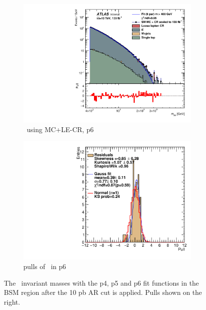 \begin{figure}[H]
\begin{subfigure}[h]{0.38\linewidth}
    \includegraphics[scale=0.3]{figs/ch6/fit/variable_nosmooth/p6/10PB/output_SMMCplusCR_Mbb_p6.pdf}%
    \caption{\mbb \ using MC+LE-CR, p6}
    \end{subfigure}
    \hfill
    \begin{subfigure}[h]{0.4\linewidth}
    \includegraphics[scale=0.32]{figs/ch6/fit/variable_nosmooth/p6/10PB/pull_SMMCplusCR_Mbb_p6.pdf}%
    \caption{pulls of \mbb \ in p6}
    \end{subfigure}
    \hfill
    \caption{The \mbb \ invariant masses with the p4, p5 and p6 fit functions in the BSM region after the 10 pb AR cut is applied. Pulls shown on the right.}
\label{fig:mbb-fit-pulls}
\end{figure}

\newpage

